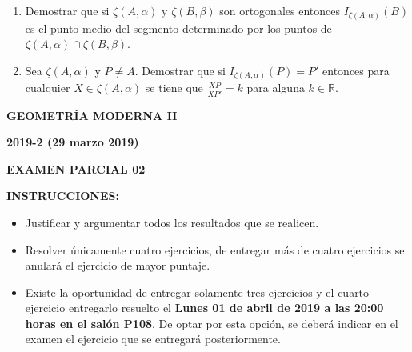 \documentclass[10pt]{report}
\newcommand{\R}{\mathbb R}
\begin{document}
\begin{enumerate}
\item Demostrar que si $\zeta(A,\alpha)$ y $\zeta(B, \beta)$ son ortogonales entonces $I_{\zeta(A, \alpha)}(B)$ es el punto medio del segmento determinado por los puntos de $\zeta(A,\alpha) \cap \zeta(B,\beta)$.



\item Sea $\zeta(A, \alpha)$ y $P\neq A$. Demostrar que si $I_{\zeta(A, \alpha)}(P)=P'$ entonces para cualquier $X \in \zeta(A, \alpha)$ se tiene que $\frac{XP}{XP'} = k$ para alguna $k \in \R$.


\end{enumerate}

\vspace{2cm}


\begin{center}
\textbf{\LARGE {GEOMETRÍA MODERNA II}}
\end{center}

\begin{center}
\textbf{{\large 2019-2 (29 marzo 2019)}}
\end{center}

\begin{center}
\textbf{{\large EXAMEN PARCIAL 02}}
\end{center}

{\bf INSTRUCCIONES:}
\begin{itemize}
\item Justificar y argumentar todos los resultados que se realicen.
\item Resolver únicamente cuatro ejercicios, de entregar más de cuatro ejercicios se anulará el ejercicio de mayor puntaje.
\item Existe la oportunidad de entregar solamente tres ejercicios y el cuarto ejercicio entregarlo resuelto el \textbf{Lunes 01 de abril de 2019 a las 20:00 horas en el salón P108}. De optar por esta opción, se deberá indicar en el examen el ejercicio que se entregará posteriormente.

\end{itemize}
\end{document}
